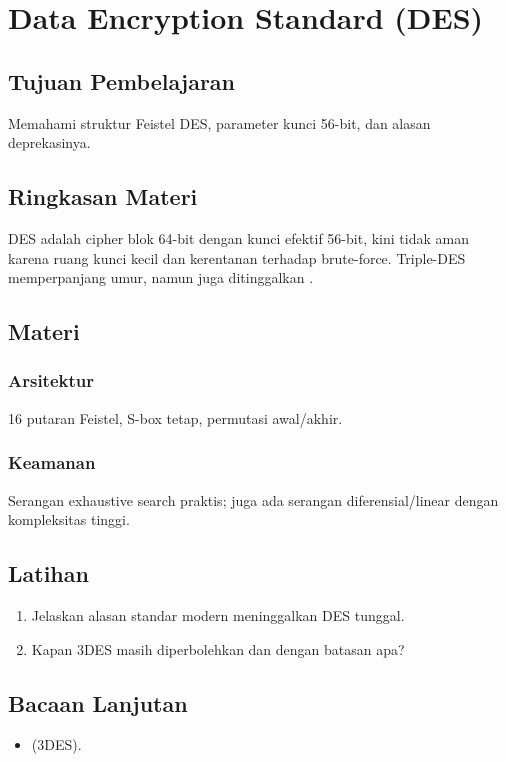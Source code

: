 \documentclass[../main.tex]{subfiles}
\begin{document}
\chapter{Data Encryption Standard (DES)}
\section{Tujuan Pembelajaran}
Memahami struktur Feistel DES, parameter kunci 56-bit, dan alasan deprekasinya.

\section{Ringkasan Materi}
DES adalah cipher blok 64-bit dengan kunci efektif 56-bit, kini tidak aman karena ruang kunci kecil dan kerentanan terhadap brute-force. Triple-DES memperpanjang umur, namun juga ditinggalkan \citep{sp80067r2}.

\section{Materi}
\subsection{Arsitektur}
16 putaran Feistel, S-box tetap, permutasi awal/akhir.

\subsection{Keamanan}
Serangan exhaustive search praktis; juga ada serangan diferensial/linear dengan kompleksitas tinggi.

\section{Latihan}
\begin{enumerate}
  \item Jelaskan alasan standar modern meninggalkan DES tunggal.
  \item Kapan 3DES masih diperbolehkan dan dengan batasan apa?
\end{enumerate}

\section{Bacaan Lanjutan}
\begin{itemize}
  \item \citep{sp80067r2} (3DES).
\end{itemize}
\end{document}

